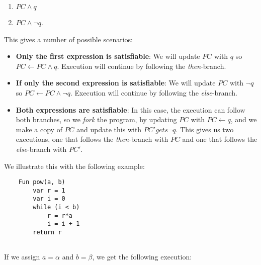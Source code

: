 		\begin{enumerate}
			\item $ PC \land q$
			\item $ PC \land \neg q$.
		\end{enumerate}
		
		This gives a number of possible scenarios:
		
		\begin{itemize}
			\item \textbf{Only the first expression is satisfiable}: We will update $PC$ with $q$ so $PC \gets PC \land q$. Execution will continue by following the \emph{then}-branch.
			\item \textbf{If only the second expression is satisfiable}: We will update $PC$ with $\neg q$ so $PC \gets PC \land \neg q$. Execution will continue by following the \emph{else}-branch.
			\item \textbf{Both expressions are satisfiable}: In this case, the execution can follow both branches, so we \emph{fork} the program, by updating $PC$ with $PC \gets q$, and we make a copy of $PC$ and update this with $PC' gets \neg q$. This gives us two executions, one that follows the \emph{then}-branch with $PC$ and one that follows the \emph{else}-branch with $PC'$.  
		\end{itemize}
		
		We illustrate this with the following example:
		
	\begin{lstlisting}
	Fun pow(a, b) 
		var r = 1
		var i = 0
		while (i < b) 
			r = r*a
			i = i + 1 
		return r
		
		\end{lstlisting}
		
		If we assign $a = \alpha$ and $b = \beta$, we get the following execution:
		
